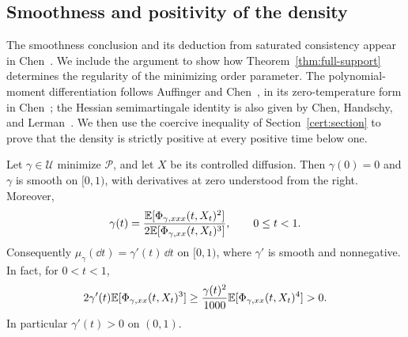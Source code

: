 \subsection{Smoothness and positivity of the density}\label{sec:density}

The smoothness conclusion and its deduction from saturated consistency
appear in Chen~\cite[Theorem~1.3 and Proposition~4.6]{Chen2026}.
We include the argument to show how Theorem~\ref{thm:full-support}
determines the regularity of the minimizing order parameter.
The polynomial-moment differentiation follows Auffinger and
Chen~\cite[Lemma~2 and the proof of Theorem~2(ii)]{ACProperties2015},
in its zero-temperature form in Chen~\cite[Appendix~B.6]{Chen2026};
the Hessian semimartingale identity is also given by Chen, Handschy,
and Lerman~\cite[Lemma~3]{CHL2018}. We then use the coercive inequality
of Section~\ref{cert:section} to prove that the density is strictly
positive at every positive time below one.

\begin{corollary}\label{cor:smooth-measure}
Let $\gamma\in\mathcal U$ minimize $\mathcal P$, and let $X$ be its
controlled diffusion. Then $\gamma(0)=0$ and $\gamma$ is smooth on
$[0,1)$, with derivatives at zero understood from the right. Moreover,
\begin{equation}\label{eq:gamma-moment-ratio}
 \gamma(t)=
 \frac{\mathbb E[\Phi_{\gamma,xxx}(t,X_t)^2]}
      {2\mathbb E[\Phi_{\gamma,xx}(t,X_t)^3]},
 \qquad 0\leq t<1.
\end{equation}
Consequently $\mu_\gamma(\dd t)=\gamma'(t)\,\dd t$ on $[0,1)$,
where $\gamma'$ is smooth and nonnegative. In fact, for $0<t<1$,
\begin{equation}\label{eq:positive-density-bound}
 2\gamma'(t)\mathbb E[\Phi_{\gamma,xx}(t,X_t)^3]
 \geq \frac{\gamma(t)^2}{1000}
                \mathbb E[\Phi_{\gamma,xx}(t,X_t)^4]>0.
\end{equation}
In particular $\gamma'(t)>0$ on $(0,1)$.
\end{corollary}

